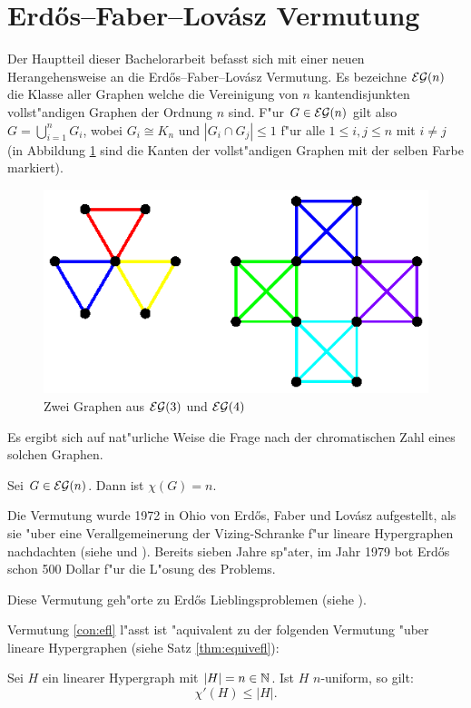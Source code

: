 \section{Erd\H{o}s--Faber--Lov\'asz Vermutung}
Der Hauptteil dieser Bachelorarbeit befasst sich mit einer neuen Herangehensweise an die Erd\H{o}s--Faber--Lov\'asz Vermutung. 
Es bezeichne ${\cal EG}(n)$ die Klasse aller Graphen welche die Vereinigung von $n$ kantendisjunkten vollst"andigen Graphen der Ordnung $n$ sind. 
F"ur $G\in{\cal EG}(n)$ gilt also $G= \bigcup\limits_{i=1}^{n} G_i$, wobei $G_i \cong K_n$ und $|G_i \cap G_j| \leq 1$ f"ur alle $1\leq i,j \leq n$ mit $i\neq j$ (in Abbildung \ref{fig:egraphen} sind die Kanten der vollst"andigen Graphen mit der selben Farbe markiert).
\begin{figure}[htbp]
        \centering
        \includegraphics{images/bildeg3und4}
        \caption{Zwei Graphen aus ${\cal EG}(3)$ und ${\cal EG}(4)$}
        \label{fig:egraphen}
\end{figure}
Es ergibt sich auf nat"urliche Weise die Frage nach der chromatischen Zahl eines solchen Graphen. 
\begin{conjecture}
Sei $G\in{\cal EG}(n)$. Dann ist $\chi(G) = n$.
\label{con:efl}
\end{conjecture}
Die Vermutung wurde 1972 in Ohio von Erd\H{o}s, Faber und Lov\'asz aufgestellt, als sie "uber eine Verallgemeinerung der Vizing-Schranke f"ur lineare Hypergraphen nachdachten (siehe \cite{FaberL74} und \cite{Erdos76}). Bereits sieben Jahre sp"ater, im Jahr 1979 bot Erd\H{o}s schon 500 Dollar f"ur die L"osung des Problems.

Diese Vermutung geh"orte zu Erd\H{o}s Lieblingsproblemen (siehe \cite{Erdos81}).

Vermutung \ref{con:efl} l"asst ist "aquivalent zu der folgenden Vermutung "uber lineare Hypergraphen (siehe Satz \ref{thm:equivefl}):
\begin{conjecture}
  Sei $H$ ein linearer Hypergraph mit $|H| = n \in {\mathbb{N}}$. Ist $H$ $n$-uniform, so gilt: $$ \chi'(H) \leq |H|.$$
\label{con:eflhyper}
\end{conjecture}

